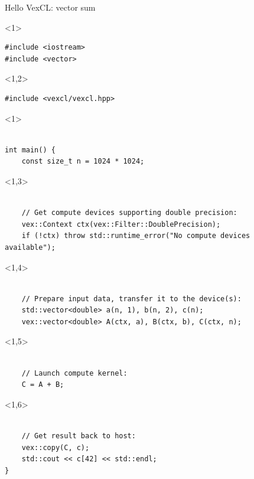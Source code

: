 \documentclass[@BEAMER_OPTIONS@]{beamer}
\begin{document}
\begin{frame}[fragile,shrink=5]{Hello VexCL: vector sum}
    \begin{exampleblock}{}
        \begin{uncoverenv}<1>
            \begin{lstlisting}
#include <iostream>
#include <vector>
            \end{lstlisting}
        \end{uncoverenv}
        \begin{uncoverenv}<1,2>
            \begin{lstlisting}[firstnumber=last]
#include <vexcl/vexcl.hpp>
            \end{lstlisting}
        \end{uncoverenv}
        \begin{uncoverenv}<1>
            \begin{lstlisting}[firstnumber=last]

int main() {
    const size_t n = 1024 * 1024;
            \end{lstlisting}
        \end{uncoverenv}
        \begin{uncoverenv}<1,3>
            \begin{lstlisting}[firstnumber=last]

    // Get compute devices supporting double precision:
    vex::Context ctx(vex::Filter::DoublePrecision);
    if (!ctx) throw std::runtime_error("No compute devices available");
            \end{lstlisting}
        \end{uncoverenv}
        \begin{uncoverenv}<1,4>
            \begin{lstlisting}[firstnumber=last]

    // Prepare input data, transfer it to the device(s):
    std::vector<double> a(n, 1), b(n, 2), c(n);
    vex::vector<double> A(ctx, a), B(ctx, b), C(ctx, n);
            \end{lstlisting}
        \end{uncoverenv}
        \begin{uncoverenv}<1,5>
            \begin{lstlisting}[firstnumber=last]

    // Launch compute kernel:
    C = A + B;
            \end{lstlisting}
        \end{uncoverenv}
        \begin{uncoverenv}<1,6>
            \begin{lstlisting}[firstnumber=last]

    // Get result back to host:
    vex::copy(C, c);
    std::cout << c[42] << std::endl;
}
            \end{lstlisting}
        \end{uncoverenv}
    \end{exampleblock}
\end{frame}
\end{document}

